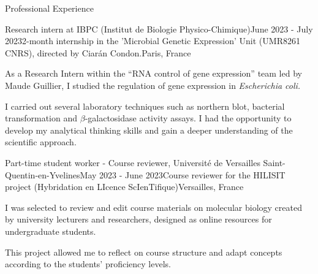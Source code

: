 \documentclass[
	10pt,
]{style} %
\begin{document}

\begin{rSection}{Professional Experience}

	\begin{rSubsection}{Research intern at IBPC (Institut de Biologie Physico-Chimique)}{June 2023 - July 2023}{2-month internship in the 'Microbial Genetic Expression' Unit (UMR8261 CNRS), directed by Ciarán Condon.}{Paris, France}
		\item As a Research Intern within the ``RNA control of gene expression'' team led by Maude Guillier, I studied the regulation of gene expression in \textit{Escherichia coli.}
		\item I carried out several laboratory techniques such as northern blot, bacterial transformation and $\beta$-galactosidase activity assays. I had the opportunity to develop my analytical thinking skills and gain a deeper understanding of the scientific approach.
	\end{rSubsection}


	\begin{rSubsection}{Part-time student worker - Course reviewer, Université de Versailles Saint-Quentin-en-Yvelines}{May 2023 - June 2023}{Course reviewer for the HILISIT project (Hybridation en LIcence ScIenTifique)}{Versailles, France}
		\item I was selected to review and edit course materials on molecular biology created by university lecturers and researchers, designed as online resources for undergraduate students.
		\item This project allowed me to reflect on course structure and adapt concepts according to the students' proficiency levels.
	\end{rSubsection}

\end{rSection}

\end{document}
